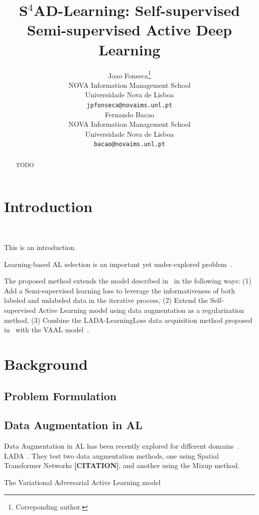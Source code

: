 \documentclass{article}
\title{%
    S$^4$AD-Learning: Self-supervised Semi-supervised Active Deep Learning
}
\author{%
  Joao Fonseca\thanks{Correponding author.} \\
  NOVA Information Management School\\
  Universidade Nova de Lisboa\\
  \texttt{jpfonseca@novaims.unl.pt} \\
  \And%
  Fernando Bacao \\
  NOVA Information Management School\\
  Universidade Nova de Lisboa\\
  \texttt{bacao@novaims.unl.pt} \\
}
\begin{document}
\maketitle

\begin{abstract}
    TODO
\end{abstract}


\section{Introduction}~\label{sec:introduction}

This is an introduction.

Learning-based AL selection is an important yet under-explored
problem~\cite{gao2020consistency}.

The proposed method extends the model described in~\cite{bengar2021reducing}
in the following ways: (1) Add a Semi-supervised learning loss to leverage the
informativeness of both labeled and unlabeled data in the iterative process,
(2) Extend the Self-supervised Active Learning model using data augmentation
as a regularization method, (3) Combine the LADA-LearningLoss data acquisition
method proposed in~\cite{kim2021lada} with the VAAL model~\cite{kim2021task}.

\section{Background}

\subsection{Problem Formulation}


\subsection{Data Augmentation in AL}

Data Augmentation in AL has been recently explored for different
domains~\cite{kim2021lada, quteineh2020textual, li2021framework}.
LADA~\cite{kim2021lada}. They test two data augmentation methods, one using
Spatial Transformer Networks {\bf [CITATION]}, and another using the Mixup
method.

The Variational Adversarial Active Learning model~\cite{sinha2019variational}
\end{document}
